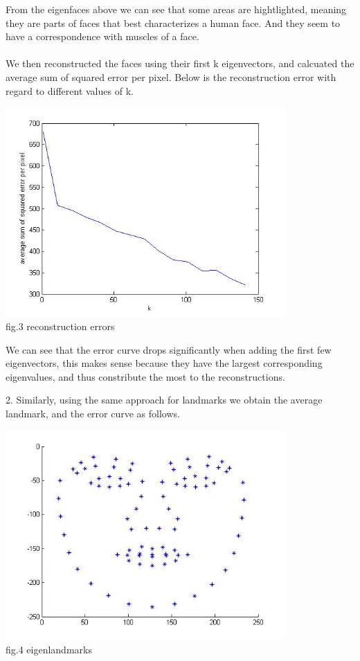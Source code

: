 \documentclass[12pt]{article}
\newenvironment{problem}[2][Part]{\begin{trivlist}
\item[\hskip \labelsep {\bfseries #1}\hskip \labelsep {\bfseries #2}]}{\end{trivlist}}
\begin{document}
\begin{problem}{1. ASM and AAM model for face reconstruction}
\begin{center}
\end{center}
From the eigenfaces above we can see that some areas are hightlighted, meaning they are parts of faces that best characterizes a human face. And they seem to have a correspondence with muscles of a face.
\\\\We then reconstructed the faces using their first k eigenvectors, and calcuated the average sum of squared error per pixel. Below is the reconstruction error with regard to different values of k.\\
\begin{center}
		\includegraphics[height=8cm]{error_face.jpg}{\\fig.3 reconstruction errors}
\end{center}
We can see that the error curve drops significantly when adding the first few eigenvectors, this makes sense because they have the largest corresponding eigenvalues, and thus constribute the most to the reconstructions.\\
\item{2.}
Similarly, using the same approach for landmarks we obtain the average landmark, and the error curve as follows.\\
\begin{center}
		\includegraphics[height=8cm]{avglandmark.jpg}{\\fig.4 eigenlandmarks}

\end{center}
\end{problem}
\end{document}
